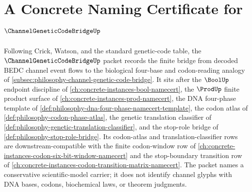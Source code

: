\chapter{A Concrete Naming Certificate for $\ChannelGeneticCodeBridgeUp$}
\label{ch:concrete-instances-channel-genetic-code-bridge-namecert}

Following Crick, Watson, and the standard genetic-code table, the $\ChannelGeneticCodeBridgeUp$ packet records the finite bridge from decoded BEDC channel event flows to the biological four-base and codon-reading analogy of \autoref{subsec:philosophy-channel-genetic-code-bridge}. It sits after the $\BoolUp$ endpoint discipline of \autoref{ch:concrete-instances-bool-namecert}, the $\ProdUp$ finite product surface of \autoref{ch:concrete-instances-prod-namecert}, the DNA four-phase template of \autoref{def:philosophy-dna-four-phase-namecert-template}, the codon atlas of \autoref{def:philosophy-codon-phase-atlas}, the genetic translation classifier of \autoref{def:philosophy-genetic-translation-classifier}, and the stop-role bridge of \autoref{def:philosophy-stop-role-bridge}. Its codon-atlas and translation-classifier rows are downstream-compatible with the finite codon-window row of \autoref{ch:concrete-instances-codon-six-bit-window-namecert} and the stop-boundary transition row of \autoref{ch:concrete-instances-codon-transition-matrix-namecert}. The packet names a conservative scientific-model carrier; it does not identify channel glyphs with DNA bases, codons, biochemical laws, or theorem judgments.

